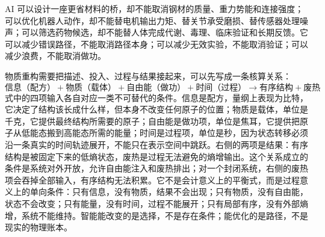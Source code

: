 AI 可以设计一座更省材料的桥，却不能取消钢材的质量、重力势能和连接强度；可以优化机器人动作，却不能替电机输出力矩、替关节承受磨损、替传感器处理噪声；可以筛选药物候选，却不能替人体完成代谢、毒理、临床验证和长期反馈。它可以减少错误路径，不能取消路径本身；可以减少无效实验，不能取消验证；可以减少浪费，不能取消做功。

物质重构需要把描述、投入、过程与结果接起来，可以先写成一条核算关系：
\begin{equation}
\text{信息（配方）}+\text{物质（载体）}+\text{自由能（做功）}+\text{时间（过程）}\longrightarrow \text{有序结构}+\text{废热}
\label{eq:conservation}
\end{equation}
式中的四项输入各自对应一类不可替代的条件。信息是配方，量纲上表现为比特，它决定了结构该长成什么样，但本身不改变任何原子的位置；物质是载体，单位是千克，它提供最终结构所需要的原子；自由能是做功项，单位是焦耳，它提供把原子从低能态搬到高能态所需的能量；时间是过程项，单位是秒，因为状态转移必须沿一条真实的时间轨迹展开，不能只在表示空间中跳跃。右侧的两项是结果：有序结构是被固定下来的低熵状态，废热是过程无法避免的熵增输出。这个关系成立的条件是系统对外开放，允许自由能注入和废热排出；对一个封闭系统，右侧的废热项会吞掉全部输入，有序结构无法积累。它不是会计意义上的平衡式，而是过程意义上的单向条件：只有信息，没有物质，结果不会出现；只有物质，没有自由能，状态不会改变；只有能量，没有时间，过程不能展开；只有局部有序，没有外部熵增，系统不能维持。智能能改变的是选择，不是存在条件；能优化的是路径，不是现实的物理账本。
